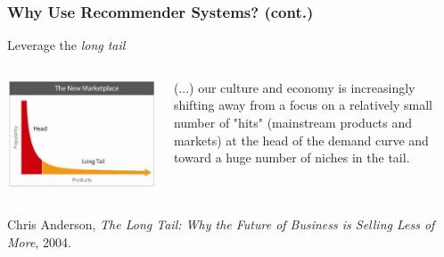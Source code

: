 \documentclass{beamer}
\begin{document}
\begin{frame}
    \frametitle{Why Use Recommender Systems? (cont.)}
    Leverage the \emph{long tail}
    \begin{columns}
        \begin{center}
            \includegraphics[width=\linewidth]{long-tail}
        \end{center}
         \footnotesize (...) our culture and economy is
        increasingly shifting away from a focus on a relatively small number of
        "hits" (mainstream products and markets) at the head of the demand
        curve and toward a huge number of niches in the tail.
    \end{columns}
    \vsep
    \small Chris Anderson, \textit{The Long Tail: Why the Future of Business is
      Selling Less of More}, 2004.
\end{frame}
\end{document}
